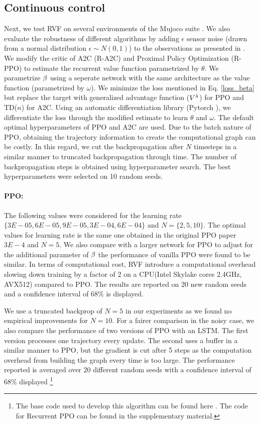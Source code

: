 \subsection{Continuous control}
Next, we test RVF on several environments of the Mujoco suite \citep{todorov2012mujoco}. We also evaluate the robustness of different algorithms by adding $\epsilon$ sensor noise (drawn from a normal distribution $\epsilon \sim N(0,1)$) to the observations as presented in \citep{zhang2018dissection}.
We modify the critic of A2C \citep{wu2017scalable} (R-A2C) and Proximal Policy Optimization (R-PPO) \citep{schulman2017proximal} to estimate the recurrent value function parametrized by $\theta$. We parametrize $\beta$ using a seperate network with the same architecture as the value function (parametrized by $\omega$). We minimize the loss mentioned in Eq. \ref{loss_beta} but replace the target with generalized advantage function ($V^{\lambda}$) \citep{schulman2015high} for PPO and TD($n$) for A2C. Using an automatic differentiation library (Pytorch \citep{paszke2017automatic}), we differentiate the loss through the modified estimate to learn $\theta$ and $\omega$. The default optimal hyperparameters of PPO and A2C are used. Due to the batch nature of PPO, obtaining the trajectory information to create the computational graph can be costly. In this regard, we cut the backpropagation after $N$ timesteps in a similar manner to truncated backpropagation through time. The number of backpropagation steps is obtained using hyperparameter search. The best hyperparameters were selected on 10 random seeds. 
\paragraph{PPO:} The following values were considered for the learning rate $\{3E-05,6E-05,9E-05,3E-04,6E-04\}$ and $N = \{2,5,10\}$.  The optimal values for learning rate is the same one obtained in the original PPO paper $3E-4$ and $N=5$.
We also compare with a larger network for PPO to adjust for the additional parameter of $\beta$ the performance of vanilla PPO were found to be similar. In terms of computational cost, RVF introduce a computational overhead slowing down training by a factor of 2 on a CPU(Intel Skylake cores 2.4GHz, AVX512) compared to PPO. The results are reported on 20 new random seeds and a confidence interval of $68\%$ is displayed. 

We use a truncated backprop of $N=5$ in our experiments as we found no empirical improvements for $N=10$. For a fairer comparison in the noisy case, we also compare the performance of two versions of PPO with an LSTM. The first version processes one trajectory every update. The second uses a buffer in a similar manner to PPO, but the gradient is cut after 5 steps as the computation overhead from building the graph every time is too large. The performance reported is averaged over 20 different random seeds with a confidence interval of $68\%$ displayed \footnote{The base code used to develop this algorithm can be found here \citep{pytorchrl}. The code for Recurrent PPO can be found in the supplementary material.}

